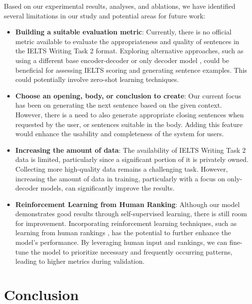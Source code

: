 \documentclass[conference]{IEEEtran}
\begin{document}
Based on our experimental results, analyses, and ablations, we have identified several limitations in our study and potential areas for future work:
\begin{itemize}
    \item \textbf{Building a suitable evaluation metric}: Currently, there is no official metric available to evaluate the appropriateness and quality of sentences in the IELTS Writing Task 2 format. Exploring alternative approaches, such as using a different base encoder-decoder \cite{encoder-decoder} or only decoder model \cite{gpt-1}, could be beneficial for assessing IELTS scoring and generating sentence examples. This could potentially involve zero-shot \cite{zero-shot} learning techniques.
    \item \textbf{Choose an opening, body, or conclusion to create}: Our current focus has been on generating the next sentence based on the given context. However, there is a need to also generate appropriate closing sentences when requested by the user, or sentences suitable in the body. Adding this feature would enhance the usability and completeness of the system for users.
    \item \textbf{Increasing the amount of data}: The availability of IELTS Writing Task 2 data is limited, particularly since a significant portion of it is privately owned. Collecting more high-quality data remains a challenging task. However, increasing the amount of data in training, particularly with a focus on only-decoder models, can significantly improve the results.
    \item \textbf{Reinforcement Learning from Human Ranking}: Although our model demonstrates good results through self-supervised learning, there is still room for improvement. Incorporating reinforcement learning techniques, such as learning from human rankings \cite{human-feedback}, has the potential to further enhance the model's performance. By leveraging human input and rankings, we can fine-tune the model to prioritize necessary and frequently occurring patterns, leading to higher metrics during validation.

\end{itemize}


\section{Conclusion}
\end{document}
